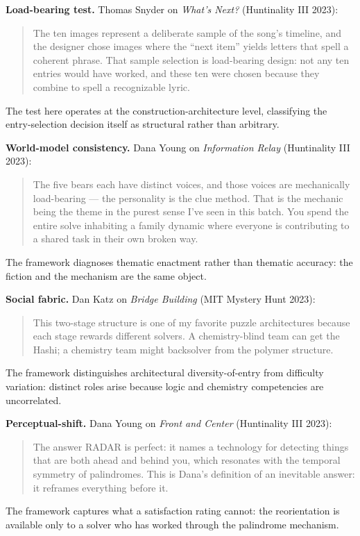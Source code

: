 \textbf{Load-bearing test.} Thomas Snyder on \textit{What's Next?} (Huntinality III 2023):
\begin{quote}
The ten images represent a deliberate sample of the song's timeline, and the designer chose images where the ``next item'' yields letters that spell a coherent phrase. That sample selection is load-bearing design: not any ten entries would have worked, and these ten were chosen because they combine to spell a recognizable lyric.
\end{quote}
The test here operates at the construction-architecture level, classifying the entry-selection decision itself as structural rather than arbitrary.

\textbf{World-model consistency.} Dana Young on \textit{Information Relay} (Huntinality III 2023):
\begin{quote}
The five bears each have distinct voices, and those voices are mechanically load-bearing --- the personality is the clue method. That is the mechanic being the theme in the purest sense I've seen in this batch. You spend the entire solve inhabiting a family dynamic where everyone is contributing to a shared task in their own broken way.
\end{quote}
The framework diagnoses thematic enactment rather than thematic accuracy: the fiction and the mechanism are the same object.

\textbf{Social fabric.} Dan Katz on \textit{Bridge Building} (MIT Mystery Hunt 2023):
\begin{quote}
This two-stage structure is one of my favorite puzzle architectures because each stage rewards different solvers. A chemistry-blind team can get the Hashi; a chemistry team might backsolver from the polymer structure.
\end{quote}
The framework distinguishes architectural diversity-of-entry from difficulty variation: distinct roles arise because logic and chemistry competencies are uncorrelated.

\textbf{Perceptual-shift.} Dana Young on \textit{Front and Center} (Huntinality III 2023):
\begin{quote}
The answer RADAR is perfect: it names a technology for detecting things that are both ahead and behind you, which resonates with the temporal symmetry of palindromes. This is Dana's definition of an inevitable answer: it reframes everything before it.
\end{quote}
The framework captures what a satisfaction rating cannot: the reorientation is available only to a solver who has worked through the palindrome mechanism.

